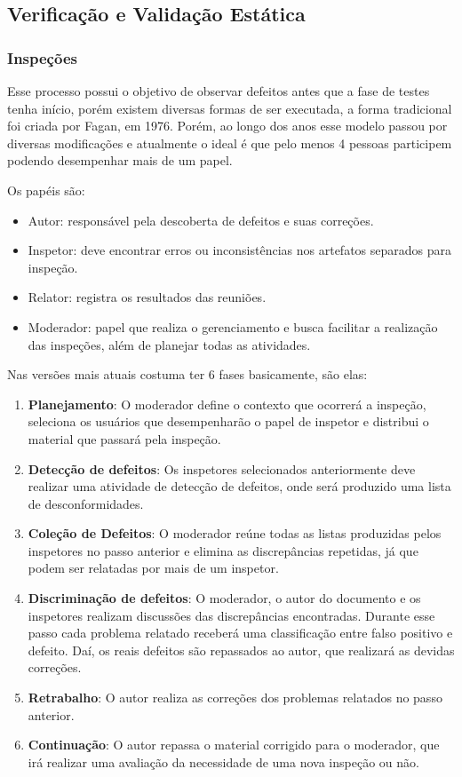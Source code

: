 \documentclass[runningheads]{llncs}
\begin{document}
\subsection{Verificação e Validação Estática}

\subsubsection{Inspeções}
Esse processo possui o objetivo de observar defeitos antes que a fase de testes tenha início, porém existem diversas formas de ser executada, a forma tradicional foi criada por Fagan, em 1976. Porém, ao longo dos anos esse modelo passou por diversas modificações e atualmente o ideal é que pelo menos 4 pessoas participem podendo desempenhar mais de um papel.

Os papéis são:
\begin{itemize}
    \item Autor: responsável pela descoberta de defeitos e suas correções.
    \item Inspetor: deve encontrar erros ou inconsistências nos artefatos separados para inspeção.
    \item Relator: registra os resultados das reuniões.
    \item Moderador: papel que realiza o gerenciamento e busca facilitar a realização das inspeções, além de planejar todas as atividades.
\end{itemize}

Nas versões mais atuais costuma ter 6 fases basicamente, são elas:
\begin{enumerate}
    \item \textbf{Planejamento}: O moderador define o contexto que ocorrerá a inspeção, seleciona os usuários que desempenharão o papel de inspetor e distribui o material que passará pela inspeção.
    \item \textbf{Detecção de defeitos}: Os inspetores selecionados anteriormente deve realizar uma atividade de detecção de defeitos, onde será produzido uma lista de desconformidades.
    \item \textbf{Coleção de Defeitos}: O moderador reúne todas as listas produzidas pelos inspetores no passo anterior e elimina as discrepâncias repetidas, já que podem ser relatadas por mais de um inspetor.
    \item \textbf{Discriminação de defeitos}: O moderador, o autor do documento e os inspetores realizam discussões das discrepâncias encontradas. Durante esse passo cada problema relatado receberá uma classificação entre falso positivo e defeito. Daí, os reais defeitos são repassados ao autor, que realizará as devidas correções.
    \item \textbf{Retrabalho}: O autor realiza as correções dos problemas relatados no passo anterior.
    \item \textbf{Continuação}: O autor repassa o material corrigido para o moderador, que irá realizar uma avaliação da necessidade de uma nova inspeção ou não.
\end{enumerate}
\end{document}
